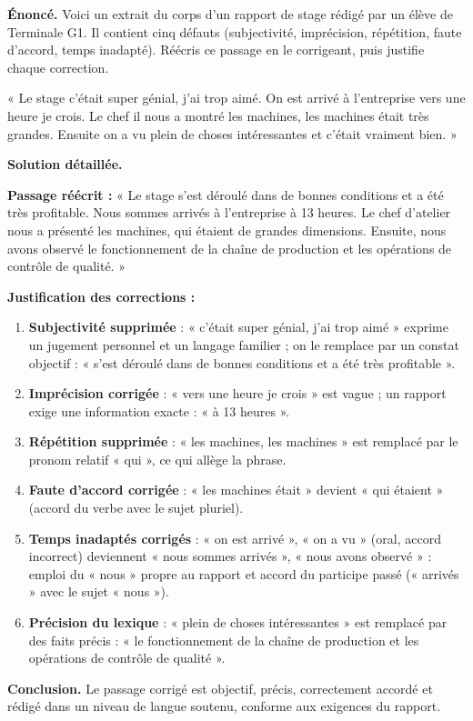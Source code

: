 \documentclass[11pt]{article}
\begin{document}
\begin{exoresolu}
\textbf{Énoncé.} Voici un extrait du corps d'un rapport de stage rédigé par un élève de Terminale G1. Il contient cinq défauts (subjectivité, imprécision, répétition, faute d'accord, temps inadapté). Réécris ce passage en le corrigeant, puis justifie chaque correction.

« Le stage c'était super génial, j'ai trop aimé. On est arrivé à l'entreprise vers une heure je crois. Le chef il nous a montré les machines, les machines était très grandes. Ensuite on a vu plein de choses intéressantes et c'était vraiment bien. »

\tcblower
\textbf{Solution détaillée.}

\textbf{Passage réécrit :}
« Le stage s'est déroulé dans de bonnes conditions et a été très profitable. Nous sommes arrivés à l'entreprise à 13 heures. Le chef d'atelier nous a présenté les machines, qui étaient de grandes dimensions. Ensuite, nous avons observé le fonctionnement de la chaîne de production et les opérations de contrôle de qualité. »

\textbf{Justification des corrections :}
\begin{enumerate}
\item \textbf{Subjectivité supprimée} : « c'était super génial, j'ai trop aimé » exprime un jugement personnel et un langage familier ; on le remplace par un constat objectif : « s'est déroulé dans de bonnes conditions et a été très profitable ».
\item \textbf{Imprécision corrigée} : « vers une heure je crois » est vague ; un rapport exige une information exacte : « à 13 heures ».
\item \textbf{Répétition supprimée} : « les machines, les machines » est remplacé par le pronom relatif « qui », ce qui allège la phrase.
\item \textbf{Faute d'accord corrigée} : « les machines était » devient « qui étaient » (accord du verbe avec le sujet pluriel).
\item \textbf{Temps inadaptés corrigés} : « on est arrivé », « on a vu » (oral, accord incorrect) deviennent « nous sommes arrivés », « nous avons observé » : emploi du « nous » propre au rapport et accord du participe passé (« arrivés » avec le sujet « nous »).
\item \textbf{Précision du lexique} : « plein de choses intéressantes » est remplacé par des faits précis : « le fonctionnement de la chaîne de production et les opérations de contrôle de qualité ».
\end{enumerate}
\textbf{Conclusion.} Le passage corrigé est objectif, précis, correctement accordé et rédigé dans un niveau de langue soutenu, conforme aux exigences du rapport.
\end{exoresolu}
\end{document}
